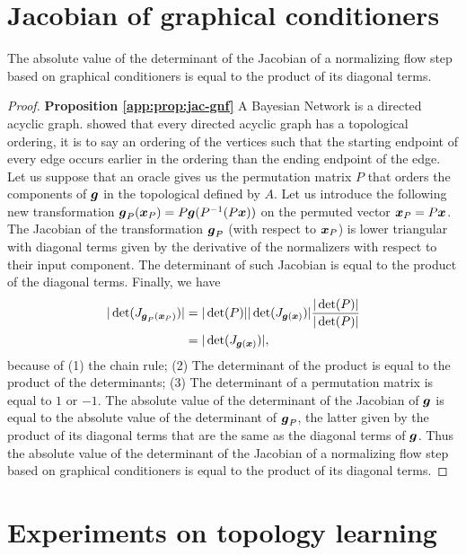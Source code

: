 \section{Jacobian of graphical conditioners}\label{app:proof-jac-gnf}
\begin{proposition}\label{app:prop:jac-gnf}
The absolute value of the determinant of the Jacobian of a normalizing flow step based on graphical conditioners is equal to the product of its diagonal terms. 
\end{proposition}
\begin{proof} \textbf{Proposition \ref{app:prop:jac-gnf}}
A Bayesian Network is a directed acyclic graph. \cite{sedgewick2011algorithms} showed that every directed acyclic graph has a topological ordering, it is to say an ordering of the vertices such that the starting endpoint of every edge occurs earlier in the ordering than the ending endpoint of the edge. Let us suppose that an oracle gives us the permutation matrix $P$ that orders the components of $\boldsymbol{g}$ in the topological defined by $A$. Let us introduce the following new transformation $\boldsymbol{g}_P(\boldsymbol{x}_P) = P\boldsymbol{g}(P
^{-1}(P\boldsymbol{x}))$ on the permuted vector $\boldsymbol{x}_P = P\boldsymbol{x}$. The Jacobian of the transformation $\boldsymbol{g}_P$ (with respect to $\boldsymbol{x}_P$) is lower triangular with diagonal terms given by the derivative of the normalizers with respect to their input component. The determinant of such Jacobian is equal to the product of the diagonal terms. Finally, we have
\begin{align*}
    |\det(J_{\boldsymbol{g}_P(\boldsymbol{x}_P)})| &= |\det(P)||\det(J_{\boldsymbol{g}(\boldsymbol{x})})| \frac{|\det(P)|}{|\det(P)|}\\
    &= |\det(J_{\boldsymbol{g}(\boldsymbol{x})})|,
\end{align*}
because of (1) the chain rule; (2) The determinant of the product is equal to the product of the determinants; (3) The determinant of a permutation matrix is equal to $1$ or $-1$.
The absolute value of the determinant of the Jacobian of $\boldsymbol{g}$ is equal to the absolute value of the determinant of $\boldsymbol{g}_P$, the latter given by the product of its diagonal terms that are the same as the diagonal terms of $\boldsymbol{g}$. Thus the absolute value of the determinant of the Jacobian of a normalizing flow step based on graphical conditioners is equal to the product of its diagonal terms.
\end{proof}
\section{Experiments on topology learning}\label{app:top_dataset}
